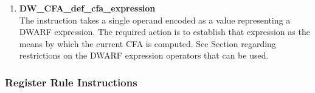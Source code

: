 \begin{enumerate}[1.]
\item \textbf{DW\-\_CFA\-\_def\-\_cfa\-\_expression} \\
The  instruction takes a 
single
operand encoded as a  value representing a
DWARF expression. The required action is to establish that
expression as the means by which the current CFA is computed.
See 
Section  
regarding restrictions on the DWARF
expression operators that can be used.

\end{enumerate}

\subsubsection{Register Rule Instructions}
\label{chap:registerruleinstructions}

